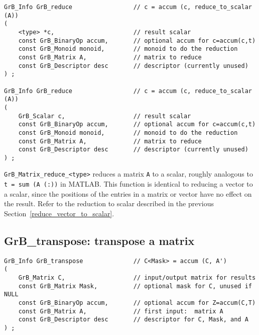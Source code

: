 \documentclass[12pt]{article}
\begin{document}
\begin{mdframed}[userdefinedwidth=6in]
{\footnotesize
\begin{verbatim}
GrB_Info GrB_reduce                 // c = accum (c, reduce_to_scalar (A))
(
    <type> *c,                      // result scalar
    const GrB_BinaryOp accum,       // optional accum for c=accum(c,t)
    const GrB_Monoid monoid,        // monoid to do the reduction
    const GrB_Matrix A,             // matrix to reduce
    const GrB_Descriptor desc       // descriptor (currently unused)
) ;

GrB_Info GrB_reduce                 // c = accum (c, reduce_to_scalar (A))
(
    GrB_Scalar c,                   // result scalar
    const GrB_BinaryOp accum,       // optional accum for c=accum(c,t)
    const GrB_Monoid monoid,        // monoid to do the reduction
    const GrB_Matrix A,             // matrix to reduce
    const GrB_Descriptor desc       // descriptor (currently unused)
) ;
\end{verbatim} } \end{mdframed}

\verb'GrB_Matrix_reduce_<type>' reduces a matrix \verb'A' to a scalar, roughly
analogous to \verb't = sum (A (:))' in MATLAB.  This function is identical to
reducing a vector to a scalar, since the positions of the entries in a matrix
or vector have no effect on the result.  Refer to the reduction to scalar
described in the previous Section~\ref{reduce_vector_to_scalar}.

\newpage
\subsection{{\sf GrB\_transpose:} transpose a matrix} %
\label{transpose}

\begin{mdframed}[userdefinedwidth=6in]
{\footnotesize
\begin{verbatim}
GrB_Info GrB_transpose              // C<Mask> = accum (C, A')
(
    GrB_Matrix C,                   // input/output matrix for results
    const GrB_Matrix Mask,          // optional mask for C, unused if NULL
    const GrB_BinaryOp accum,       // optional accum for Z=accum(C,T)
    const GrB_Matrix A,             // first input:  matrix A
    const GrB_Descriptor desc       // descriptor for C, Mask, and A
) ;
\end{verbatim} } \end{mdframed}
\end{document}
